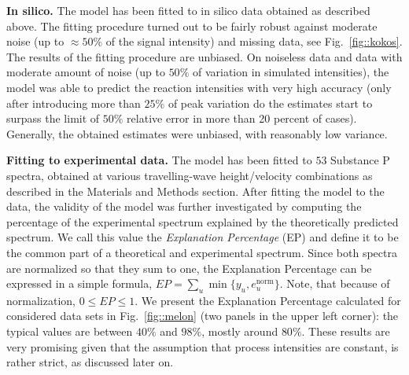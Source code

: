 \documentclass{llncs}
\begin{document}
\textbf{In silico.} The model has been fitted to in silico data obtained as described above. The fitting procedure turned out to be fairly robust against moderate noise (up to $ \approx 50\%$ of the signal intensity) and missing data, see Fig.~\ref{fig::kokos}. The results of the fitting procedure are unbiased. On noiseless data and data with moderate amount of noise (up to $50\%$ of variation in simulated intensities), the model was able to predict the reaction intensities with very high accuracy (only after introducing more than $25\%$ of peak variation do the estimates start to surpass the limit of $50\%$ relative error in more than 20 percent of cases). Generally, the obtained estimates were unbiased, with reasonably low variance.

\textbf{Fitting to experimental data.} The model has been fitted to $53$ Substance P spectra, obtained at various travelling-wave height/velocity combinations as described in the Materials and Methods section. After fitting the model to the data, the validity of the model was further investigated by computing the percentage of the experimental spectrum explained by the theoretically predicted spectrum. We call this value the \textit{Explanation Percentage} (EP) and define it to be the common part of a theoretical and experimental spectrum. Since both spectra are normalized so that they sum to one, the Explanation Percentage can be expressed in a simple formula,
$ EP = \sum_u \min\{y_u, e_u^\text{norm}\}.$
Note, that because of normalization, $0 \leq EP \leq 1$. We present the Explanation Percentage calculated for considered data sets in Fig.~\ref{fig::melon} (two panels in the upper left corner): the typical values are between $40\%$ and $98\%$, mostly around $80\%$. These results are very promising given that the assumption that process intensities are constant, is rather strict, as discussed later on.
\end{document}
